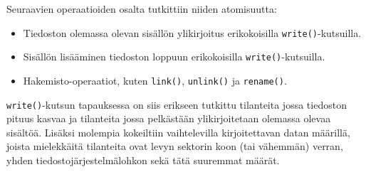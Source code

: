 \newcommand{\hdr}[1]{\rotatebox[origin=l]{90}{\small \texttt{#1}}}
\pgfmathsetlengthmacro\sideA{0.8mm}
\pgfmathsetlengthmacro{}
\pgfmathsetlengthmacro{}
\def\side{1}
\DeclareRobustCommand{\atS}{\tikz{\draw[fill] (0,0) rectangle (\sideA, \sideA); \draw       (\sideA,0) rectangle (\sideB, \sideB); \draw       (\sideB,0) rectangle (\sideC, \sideC); }}
\DeclareRobustCommand{\atB}{\tikz{\draw[fill] (0,0) rectangle (\sideA, \sideA); \draw[fill] (\sideA,0) rectangle (\sideB, \sideB); \draw       (\sideB,0) rectangle (\sideC, \sideC); }}
\DeclareRobustCommand{\atF}{\tikz{\draw[fill] (0,0) rectangle (\sideA, \sideA); \draw[fill] (\sideA,0) rectangle (\sideB, \sideB); \draw[fill] (\sideB,0) rectangle (\sideC, \sideC); }}


Seuraavien operaatioiden osalta tutkittiin niiden atomisuutta:
%
\begin{itemize}
    \item{Tiedoston olemassa olevan sisällön ylikirjoitus erikokoisilla \texttt{write()}-kutsuilla.}
    \item{Sisällön lisääminen tiedoston loppuun erikokoisilla \texttt{write()}-kutsuilla.}
    \item{Hakemisto-operaatiot, kuten \texttt{link()}, \texttt{unlink()} ja \texttt{rename()}.}
\end{itemize}
%
\texttt{write()}-kutsun tapauksessa on siis erikseen tutkittu tilanteita jossa tiedoston pituus kasvaa ja tilanteita jossa pelkästään ylikirjoitetaan olemassa olevaa sisältöä.
Lisäksi molempia kokeiltiin vaihtelevilla kirjoitettavan datan määrillä,
joista mielekkäitä tilanteita ovat levyn sektorin koon (tai vähemmän) verran, yhden tiedostojärjestelmälohkon sekä tätä suuremmat määrät.

